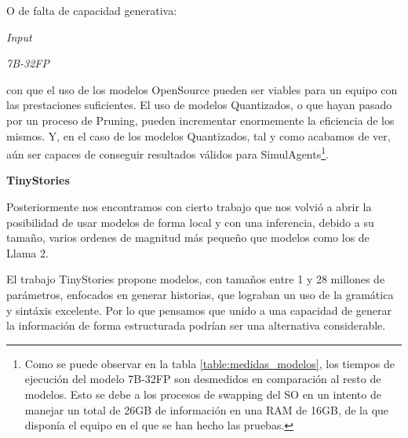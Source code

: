 O de falta de capacidad generativa:

\begin{multicols}{2}
\textit{Input}
\begin{quote}
\end{quote}

\columnbreak

\textit{7B-32FP}
\begin{quote}
\end{quote}
\end{multicols}

con que el uso de los modelos OpenSource pueden ser viables para un equipo con las prestaciones suficientes. El uso de modelos Quantizados, o que hayan pasado por un proceso de Pruning, pueden incrementar enormemente la eficiencia de los mismos. Y, en el caso de los modelos Quantizados, tal y como acabamos de ver, aún ser capaces de conseguir resultados válidos para SimulAgents\footnote{Como se puede observar en la tabla \ref{table:medidas_modelos}, los tiempos de ejecución del modelo 7B-32FP son desmedidos en comparación al resto de modelos. Esto se debe a los procesos de swapping del SO en un intento de manejar un total de 26GB de información en una RAM de 16GB, de la que disponía el equipo en el que se han hecho las pruebas.}.

\textbf{TinyStories}

Posteriormente nos encontramos con cierto trabajo que nos volvió a abrir la posibilidad de usar modelos de forma local y con una inferencia, debido a su tamaño, varios ordenes de magnitud más pequeño que modelos como los de Llama 2.

El trabajo TinyStories \cite{eldan2023tinystories} propone modelos, con tamaños entre 1 y 28 millones de parámetros, enfocados en generar historias, que lograban un uso de la gramática y sintáxis excelente. Por lo que pensamos que unido a una capacidad de generar la información de forma estructurada podrían ser una alternativa considerable.

